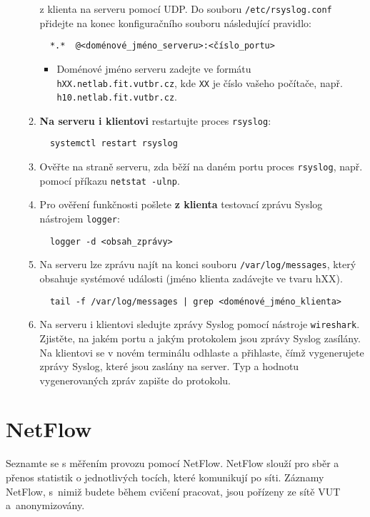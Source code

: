 \begin{itemize}
\begin{enumerate}
        z klienta na serveru pomocí UDP.
        Do souboru {\tt /etc/rsyslog.conf} přidejte na konec konfiguračního souboru následující pravidlo:
\begin{verbatim} 
  *.*  @<doménové_jméno_serveru>:<číslo_portu>
\end{verbatim}
      \begin{itemize}
        \item Doménové jméno serveru zadejte ve formátu \texttt{hXX.netlab.fit.vutbr.cz}, kde \texttt{XX} je číslo vašeho počítače, např. \texttt{h10.netlab.fit.vutbr.cz}.
      \end{itemize}
      \item {\bf Na serveru i klientovi} restartujte proces {\tt rsyslog}: 
\begin{verbatim}
  systemctl restart rsyslog
\end{verbatim} 
      \item Ověřte na straně serveru, zda běží na daném portu proces {\tt rsyslog}, např. pomocí příkazu \verb|netstat -ulnp|.
      \item Pro ověření funkčnosti pošlete {\bf z klienta} testovací zprávu Syslog nástrojem {\tt logger}:
\begin{verbatim} 
  logger -d <obsah_zprávy>
\end{verbatim} 
      \item Na serveru lze zprávu najít na konci souboru {\tt /var/log/messages}, který obsahuje
        systémové události (jméno klienta zadávejte ve tvaru hXX).
\begin{verbatim} 
  tail -f /var/log/messages | grep <doménové_jméno_klienta>
\end{verbatim} 
      \item Na serveru i klientovi sledujte zprávy Syslog pomocí nástroje {\tt wireshark}. Zjistěte, na jakém portu a jakým protokolem jsou zprávy Syslog zasílány. Na klientovi se v novém terminálu odhlaste a přihlaste, čímž vygenerujete zprávy Syslog, které jsou zaslány na server. Typ a hodnotu vygenerovaných zpráv zapište do protokolu.
    \end{enumerate}
\end{itemize}

\section{NetFlow}
Seznamte se s měřením provozu pomocí NetFlow. NetFlow slouží pro sběr a přenos statistik o jednotlivých tocích, které komunikují po síti. Záznamy NetFlow, s~nimiž budete během cvičení pracovat, jsou pořízeny ze sítě VUT a~anonymizovány.
